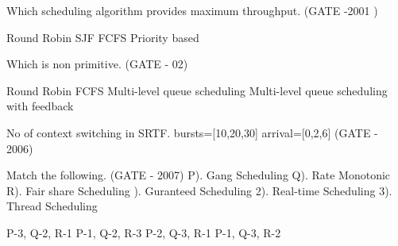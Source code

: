 
\begin{minipage}{\linewidth}

  \question Which scheduling algorithm provides maximum throughput. (GATE -2001 )

  \begin{oneparchoices}
    \choice Round Robin
    \choice SJF
    \choice FCFS
    \choice Priority based
  \end{oneparchoices}

  \end{minipage}

\vspace{0.08in}



\begin{minipage}{\linewidth}

  \question Which is non primitive. (GATE - 02)

  \begin{choices}
    \choice Round Robin
    \choice FCFS
    \choice Multi-level queue scheduling
    \choice Multi-level queue scheduling with feedback
  \end{choices}

  \end{minipage}

\vspace{0.08in}



\begin{minipage}{\linewidth}

  \question No of context switching in SRTF. bursts=[10,20,30] arrival=[0,2,6] (GATE - 2006)

  \begin{oneparchoices}
  \end{oneparchoices}

  \end{minipage}

\vspace{0.08in}



\begin{minipage}{\linewidth}

  \question Match the following. (GATE - 2007) \newline
   P). Gang Scheduling  Q). Rate Monotonic  R). Fair share Scheduling ). Guranteed Scheduling 2). Real-time Scheduling 3). Thread Scheduling
  \begin{choices}
    \choice P-3, Q-2, R-1
    \choice P-1, Q-2, R-3
    \choice P-2, Q-3, R-1
    \choice P-1, Q-3, R-2
  \end{choices}


  \end{minipage}

